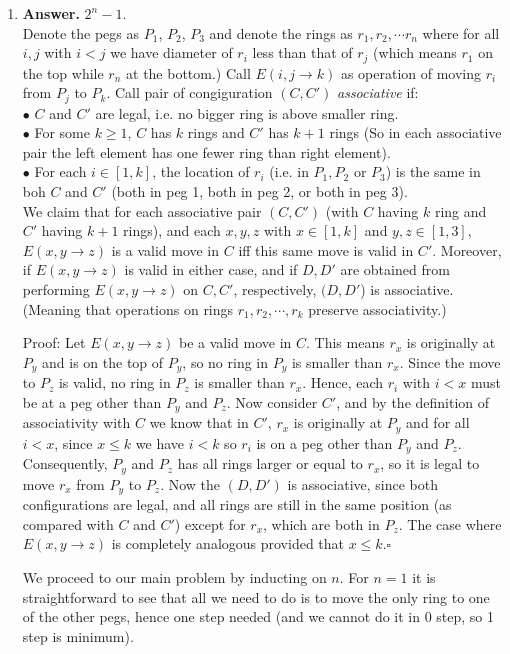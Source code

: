 \documentclass[11pt]{article}
\begin{document}
\begin{enumerate}
\item\textbf {Answer.} $2^n-1$.\\
Denote the pegs as $P_1$, $P_2$, $P_3$ and denote the rings as $r_1, r_2, \cdots r_n$ where for all $i, j$ with $i<j$ we have diameter of $r_i$ less than that of $r_j$ (which means $r_1$ on the top while $r_n$ at the bottom.) Call $E(i, j\to k)$ as operation of moving $r_i$ from $P_j$ to $P_k$. Call pair of congiguration $(C, C')$ \emph{associative} if:\\
$\bullet$ $C$ and $C'$ are legal, i.e. no bigger ring is above smaller ring.\\
$\bullet$ For some $k\ge 1$, $C$ has $k$ rings and $C'$ has $k+1$ rings (So in each associative pair the left element has one fewer ring than right element).\\
$\bullet$ For each $i\in [1,k]$, the location of $r_i$ (i.e. in $P_1, P_2$ or $P_3$) is the same in boh $C$ and $C'$ (both in peg 1, both in peg 2, or both in peg 3).\\
We claim that for each associative pair $(C,C')$ (with $C$ having $k$ ring and $C'$ having $k+1$ rings), and each $x, y, z$ with $x\in [1,k]$ and $y, z\in [1,3]$, $E(x, y\to z)$ is a valid move in $C$ iff this same move is valid in $C'$. Moreover, if $E(x, y\to z)$ is valid in either case, and if $D, D'$ are obtained from performing $E(x, y\to z)$ on $C, C'$, respectively, $(D, D'$) is associative. (Meaning that operations on rings $r_1, r_2, \cdots ,r_k$ preserve associativity.)

Proof: Let $E(x,y\to z)$ be a valid move in $C$. This means $r_x$ is originally at $P_y$ and is on the top of $P_y$, so no ring in $P_y$ is smaller than $r_x$. Since the move to $P_z$ is valid, no ring in $P_z$ is smaller than $r_x$. Hence, each $r_i$ with $i<x$ must be at a peg other than $P_y$ and $P_z$. Now consider $C'$, and by the definition of associativity with $C$ we know that in $C'$, $r_x$ is originally at $P_y$ and for all $i< x$, since $x\le k$ we have $i< k$ so $r_i$ is on a peg other than $P_y$ and $P_z$. Consequently, $P_y$ and $P_z$ has all rings larger or equal to $r_x$, so it is legal to move $r_x$ from $P_y$ to $P_z$. Now the $(D, D')$ is associative, since both configurations are legal, and all rings are still in the same position (as compared with $C$ and $C'$) except for $r_x$, which are both in $P_z$. The case where $E(x, y\to z)$ is completely analogous provided that $x\le k$.$\square$

We proceed to our main problem by inducting on $n$. For $n=1$ it is straightforward to see that all we need to do is to move the only ring to one of the other pegs, hence one step needed (and we cannot do it in 0 step, so 1 step is minimum).


\end{enumerate}
\end{document}

